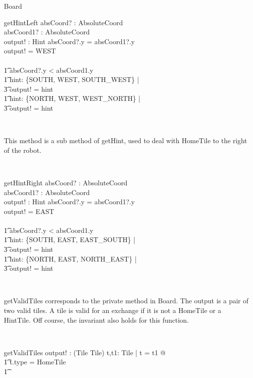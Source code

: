 \documentclass[12pt]{article}
\begin{document}
\begin{class}{Board}
\begin{schema}{getHintLeft}
absCoord? : AbsoluteCoord \\
absCoord1? : AbsoluteCoord \\
output! : Hint
\where
\IF absCoord?.y = absCoord1?.y \\
\THEN output! = WEST \\
\ELSE \\ \t1
\IF absCoord?.y < absCoord1.y \\ \t1
\THEN \exists hint: \{SOUTH, WEST, SOUTH\_WEST\} | \\ \t3 output! = hint \\ \t1
\ELSE \exists hint: \{NORTH, WEST, WEST\_NORTH\} | \\ \t3 output! = hint
\end{schema}\\
\begin{classcom}
This method is a sub method of getHint, used to deal with HomeTile to the right of the robot.
\end{classcom} \\
\begin{schema}{getHintRight}
absCoord? : AbsoluteCoord \\
absCoord1? : AbsoluteCoord \\
output! : Hint
\where
\IF absCoord?.y = absCoord1?.y \\
\THEN output! = EAST \\
\ELSE \\ \t1
\IF absCoord?.y < absCoord1.y \\ \t1
\THEN \exists hint: \{SOUTH, EAST, EAST\_SOUTH\} | \\ \t3 output! = hint \\ \t1
\ELSE \exists hint: \{NORTH, EAST, NORTH\_EAST\} | \\ \t3 output! = hint
\end{schema} \\
\begin{classcom}
getValidTiles corresponds to the private method in Board. The output is a pair of two valid tiles. A tile is valid for an exchange if it is not a HomeTile or a HintTile. Off course, the invariant also holds for this function.
\end{classcom} \\
\begin{schema}{getValidTiles}
output! : (Tile \cross Tile)
\where
\exists t,t1: Tile | t \not = t1  @ \\ \t1
t.type \not = HomeTile \\ \t1

\end{schema}
\end{class}
\end{document}
